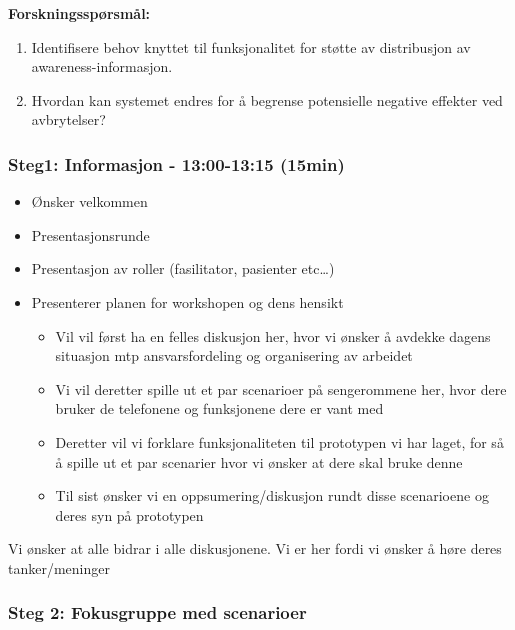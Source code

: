 \pagebreak

\textbf{Forskningsspørsmål:}
\begin{enumerate}
  \item Identifisere behov knyttet til funksjonalitet for støtte av distribusjon av awareness-informasjon.
  \item Hvordan kan systemet endres for å begrense potensielle negative effekter ved avbrytelser?
\end{enumerate}

\subsubsection{Steg1: Informasjon - 13:00-13:15 (15min)}
\begin{itemize}
  \item Ønsker velkommen
  \item Presentasjonsrunde
  \item Presentasjon av roller (fasilitator, pasienter etc\ldots)
  \item Presenterer planen for workshopen og dens hensikt
  \begin{itemize}
  \item Vil vil først ha en felles diskusjon her, hvor vi ønsker å avdekke dagens situasjon mtp ansvarsfordeling og organisering av arbeidet
  	\item Vi vil deretter spille ut et par scenarioer på sengerommene her, hvor dere bruker de telefonene og funksjonene dere er vant med
  	\item Deretter vil vi forklare funksjonaliteten til prototypen vi har laget, for så å spille ut et par scenarier hvor vi ønsker at dere skal bruke denne
  	\item Til sist ønsker vi en oppsumering/diskusjon rundt disse scenarioene og deres syn på prototypen
  \end{itemize}
\end{itemize}

\noindent
Vi ønsker at alle bidrar i alle diskusjonene. Vi er her fordi vi ønsker å høre deres tanker/meninger

\subsubsection{Steg 2: Fokusgruppe med scenarioer}

